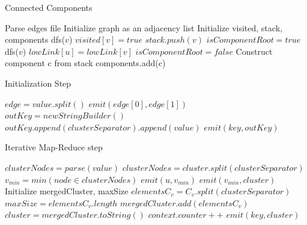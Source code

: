 \begin{algorithm}
	\caption{Connected Components}
	\label{algo:tarjan}
	\begin{algorithmic}[1]
		\State Parse edges file
		\State Initialize graph as an adjacency list
		\State Initialize visited, stack, components
				\State dfs($v$)
			\EndIf
		\EndFor
			\State $visited[v] = true$
			\State $stack.push(v)$
			\State $isComponentRoot = true$
					\State dfs($v$)
				\EndIf
					\State $lowLink[u] = lowLink[v]$
					\State $isComponentRoot = false$
				\EndIf
			\EndFor
				\State Construct component c from stack
				\State components.add(c)
			\EndIf
		\EndFunction
	\end{algorithmic}
\end{algorithm}

\begin{algorithm}[!h]
	\caption{Initialization Step}
	\label{algo:first_step}
	\begin{algorithmic}[1]
			\State $edge = value.split() $
			\State $emit(edge[0], edge[1])$
		\EndFunction
			\State $outKey = new StringBuilder()$
				\State $outKey.append(clusterSeparator).append(value)$
			\EndFor
			\State $emit(key, outKey)$
		\EndFunction
	\end{algorithmic}
\end{algorithm}

\begin{algorithm}[!h]
	\caption{Iterative Map-Reduce step}
	\label{algo:second_step}
	\begin{algorithmic}[1]
			\State $clusterNodes = parse(value)$
			\State $clusterNodes = cluster.split(clusterSeparator)$
			\State $v_{min} = min(node \in clusterNodes)$
				\State $emit(u, v_{min})$
			\EndFor
			\State $emit(v_{min}, cluster)$
		\EndFunction
			\State Initialize mergedCluster, maxSize
				\State $elementsC_v = C_v.split(clusterSeparator)$
					\State $maxSize = elementsC_v.length$ 
				\EndIf
				\State $mergedCluster.add(elementsC_v)$
			\EndFor
			\State $cluster = mergedCluster.toString()$
				\State $context.counter++$
			\EndIf
			\State $emit(key, cluster)$
		\EndFunction
	\end{algorithmic}
\end{algorithm}


